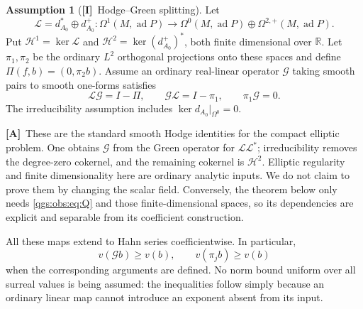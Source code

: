 \documentclass[11pt,oneside]{article}
\numberwithin{equation}{section}
\theoremstyle{plain}
\theoremstyle{definition}
\newtheorem{assumption}[assumption]{Assumption}
\theoremstyle{remark}
\newcommand{\R}{\mathbb R}
\newcommand{\Lop}{\mathcal L}
\newcommand{\Green}{\mathcal G}
\DeclareMathOperator{\ad}{ad}
\newcommand{\TA}{\textcolor{TierA}{\textsf{\bfseries[A]}}}
\newcommand{\TI}{\textcolor{TierI}{\textsf{\bfseries[I]}}}
\begin{document}
\begin{assumption}[\TI\ Hodge--Green splitting]\label{qgs:obs:ass:hodge}
Let
\begin{equation}
 \Lop=d_{A_0}^*\oplus d_{A_0}^+:
 \Omega^1(M,\ad P)\longrightarrow
 \Omega^0(M,\ad P)\oplus\Omega^{2,+}(M,\ad P).
\end{equation}
Put $\mathcal H^1=\ker\Lop$ and $\mathcal H^2=\ker(d_{A_0}^+)^*$, both finite dimensional over $\R$. Let $\pi_1,\pi_2$ be the ordinary $L^2$ orthogonal projections onto these spaces and define $\Pi(f,b)=(0,\pi_2b)$. Assume an ordinary real-linear operator $\Green$ taking smooth pairs to smooth one-forms satisfies
\begin{equation}\label{qgs:obs:eq:Q}
 \Lop\Green=I-\Pi,\qquad \Green\Lop=I-\pi_1,\qquad \pi_1\Green=0.
\end{equation}
The irreducibility assumption includes $\ker d_{A_0}|_{\Omega^0}=0$.
\end{assumption}

\TA\ These are the standard smooth Hodge identities for the compact elliptic problem. One obtains $\Green$ from the Green operator for $\Lop\Lop^*$; irreducibility removes the degree-zero cokernel, and the remaining cokernel is $\mathcal H^2$. Elliptic regularity and finite dimensionality here are ordinary analytic inputs. We do not claim to prove them by changing the scalar field. Conversely, the theorem below only needs \eqref{qgs:obs:eq:Q} and those finite-dimensional spaces, so its dependencies are explicit and separable from its coefficient construction.

All these maps extend to Hahn series coefficientwise. In particular,
\begin{equation}\label{qgs:obs:eq:Q-value}
 v(\Green b)\ge v(b),\qquad v(\pi_jb)\ge v(b)
\end{equation}
when the corresponding arguments are defined. No norm bound uniform over all surreal values is being assumed: the inequalities follow simply because an ordinary linear map cannot introduce an exponent absent from its input.
\end{document}
